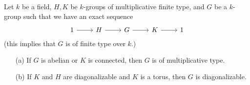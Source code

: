 \begin{proposition}\label{scheme k-group multiplicative extension prop}
Let $k$ be a field, $H,K$ be $k$-groups of multiplicative finite type, and $G$ be a $k$-group such that we have an exact sequence
\[\begin{tikzcd}
1\ar[r]&H\ar[r]&G\ar[r]&K\ar[r]&1
\end{tikzcd}\]
(this implies that $G$ is of finite type over $k$.)
\begin{enumerate}
    \item[(a)] If $G$ is abelian or $K$ is connected, then $G$ is of multiplicative type.
    \item[(b)] If $K$ and $H$ are diagonalizable and $K$ is a torus, then $G$ is diagonalizable. 
\end{enumerate}
\end{proposition}
